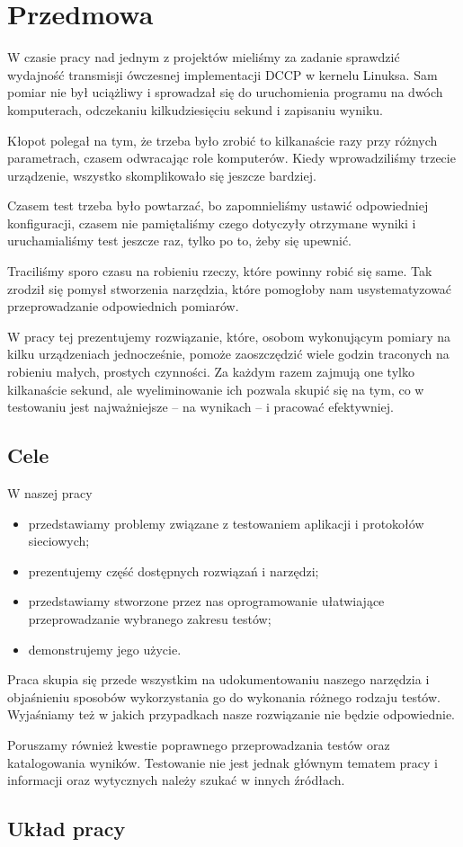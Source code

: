 \documentclass[00-praca-magisterska.tex]{subfiles}
\begin{document}
\chapter{Przedmowa}

W czasie pracy nad jednym z projektów mieliśmy za zadanie sprawdzić wydajność
transmisji ówczesnej implementacji DCCP w kernelu Linuksa. Sam pomiar nie był
uciążliwy i sprowadzał się do uruchomienia programu na dwóch komputerach,
odczekaniu kilkudziesięciu sekund i zapisaniu wyniku.

Kłopot polegał na tym, że trzeba było zrobić to kilkanaście razy przy różnych
parametrach, czasem odwracając role komputerów. Kiedy wprowadziliśmy trzecie
urządzenie, wszystko skomplikowało się jeszcze bardziej.

Czasem test trzeba było powtarzać, bo zapomnieliśmy ustawić odpowiedniej
konfiguracji, czasem nie pamiętaliśmy czego dotyczyły otrzymane wyniki i
uruchamialiśmy test jeszcze raz, tylko po to, żeby się upewnić.

Traciliśmy sporo czasu na robieniu rzeczy, które powinny robić się same. Tak
zrodził się pomysł stworzenia narzędzia, które pomogłoby nam usystematyzować
przeprowadzanie odpowiednich pomiarów.

W pracy tej prezentujemy rozwiązanie, które, osobom wykonującym pomiary na
kilku urządzeniach jednocześnie, pomoże zaoszczędzić wiele godzin traconych na
robieniu małych, prostych czynności. Za każdym razem zajmują one tylko
kilkanaście sekund, ale wyeliminowanie ich pozwala skupić się na tym, co w
testowaniu jest najważniejsze -- na wynikach -- i pracować efektywniej.

\section{Cele}

W naszej pracy
\begin{itemize}
\item przedstawiamy problemy związane z testowaniem aplikacji i
protokołów sieciowych;
\item prezentujemy część dostępnych rozwiązań i narzędzi;
\item przedstawiamy stworzone przez nas oprogramowanie ułatwiające przeprowadzanie wybranego
zakresu testów;
\item demonstrujemy jego użycie.
\end{itemize}

Praca skupia się przede wszystkim na udokumentowaniu naszego narzędzia i
objaśnieniu sposobów wykorzystania go do wykonania różnego rodzaju testów.
Wyjaśniamy też w jakich przypadkach nasze rozwiązanie nie będzie odpowiednie.

Poruszamy również kwestie poprawnego przeprowadzania testów oraz katalogowania
wyników. Testowanie nie jest jednak głównym tematem pracy i informacji oraz
wytycznych należy szukać w innych źródłach.

\section{Układ pracy}

\end{document}
